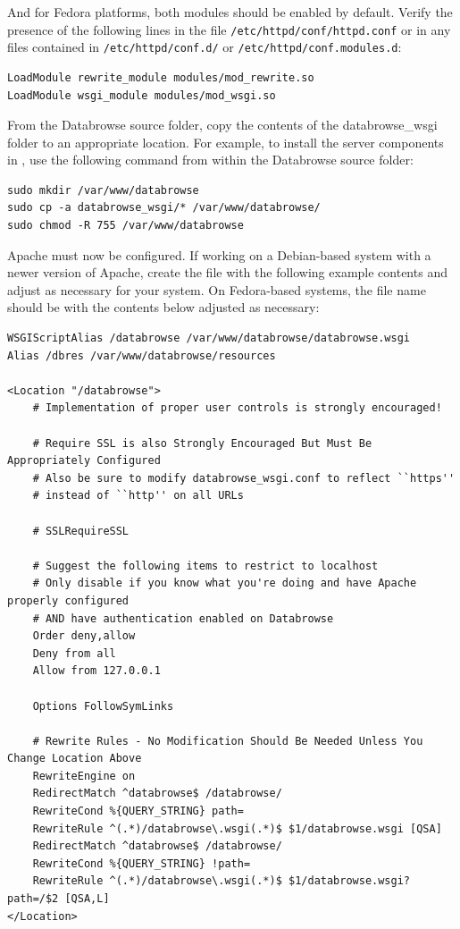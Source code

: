 \documentclass[10pt]{article}
\begin{document}
And for Fedora platforms, both modules should be enabled by default.  Verify the presence of the following lines in the file \texttt{/etc/httpd/conf/httpd.conf} or in any files contained in \texttt{/etc/httpd/conf.d/} or \texttt{/etc/httpd/conf.modules.d}:

\begin{verbatim}
LoadModule rewrite_module modules/mod_rewrite.so
LoadModule wsgi_module modules/mod_wsgi.so
\end{verbatim}

From the Databrowse source folder, copy the contents of the databrowse\_wsgi folder to an appropriate location.  For example, to install the server components in , use the following command from within the Databrowse source folder:

\begin{verbatim}
sudo mkdir /var/www/databrowse
sudo cp -a databrowse_wsgi/* /var/www/databrowse/
sudo chmod -R 755 /var/www/databrowse
\end{verbatim}

Apache must now be configured.  If working on a Debian-based system with a newer version of Apache, create the file  with the following example contents and adjust as necessary for your system.  On Fedora-based systems, the file name should be  with the contents below adjusted as necessary:

\begin{verbatim}
WSGIScriptAlias /databrowse /var/www/databrowse/databrowse.wsgi
Alias /dbres /var/www/databrowse/resources

<Location "/databrowse">
    # Implementation of proper user controls is strongly encouraged!

    # Require SSL is also Strongly Encouraged But Must Be Appropriately Configured
    # Also be sure to modify databrowse_wsgi.conf to reflect ``https'' 
    # instead of ``http'' on all URLs
    
    # SSLRequireSSL

    # Suggest the following items to restrict to localhost
    # Only disable if you know what you're doing and have Apache properly configured
    # AND have authentication enabled on Databrowse
    Order deny,allow
    Deny from all
    Allow from 127.0.0.1

    Options FollowSymLinks

    # Rewrite Rules - No Modification Should Be Needed Unless You Change Location Above
    RewriteEngine on
    RedirectMatch ^databrowse$ /databrowse/
    RewriteCond %{QUERY_STRING} path=
    RewriteRule ^(.*)/databrowse\.wsgi(.*)$ $1/databrowse.wsgi [QSA]
    RedirectMatch ^databrowse$ /databrowse/
    RewriteCond %{QUERY_STRING} !path=
    RewriteRule ^(.*)/databrowse\.wsgi(.*)$ $1/databrowse.wsgi?path=/$2 [QSA,L]
</Location>
\end{verbatim}
\end{document}
